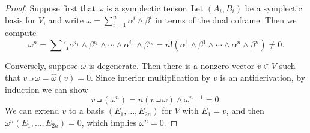 \begin{proof}
Suppose first that $\omega$ is a symplectic tensor. Let $(A_i,B_i)$ be a symplectic basis for $V$, and write $\omega=\sum_{i=1}^{n}\alpha^i\wedge\beta^i$ in terms of the dual coframe. Then we compute
\[\omega^n=\sum'_{I}\alpha^{i_1}\wedge\beta^{i_1}\wedge\cdots\wedge\alpha^{i_n}\wedge\beta^{i_n}=n!(\alpha^1\wedge\beta^1\wedge\cdots\wedge\alpha^n\wedge\beta^n)\neq 0.\]

Conversely, suppose $\omega$ is degenerate. Then there is a nonzero vector $v\in V$ such that $v\intprod\omega=\widehat{\omega}(v)=0$. Since interior multiplication by $v$ is an antiderivation, by induction we can show
\[v\intprod(\omega^n)=n(v\intprod\omega)\wedge\omega^{n-1}=0.\]
We can extend $v$ to a basis $(E_1,\dots,E_{2n})$ for $V$ with $E_1=v$, and then $\omega^n(E_1,\dots,E_{2n})=0$, which implies $\omega^n=0$.
\end{proof}
